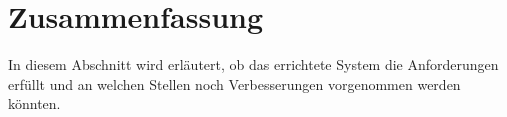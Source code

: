 \section{Zusammenfassung}
\label{sec:zusammenfassung}

In diesem Abschnitt wird erläutert, ob das errichtete System die Anforderungen
erfüllt und an welchen Stellen noch Verbesserungen vorgenommen werden könnten.





